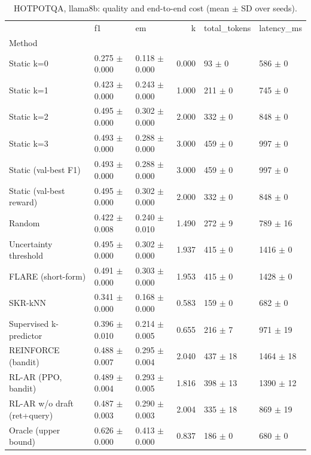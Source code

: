 \begin{table}
\caption{HOTPOTQA, llama8b: quality and end-to-end cost (mean $\pm$ SD over seeds).}
\begin{tabular}{lllrll}
\toprule
 & f1 & em & k & total_tokens & latency_ms \\
Method &  &  &  &  &  \\
\midrule
Static k=0 & 0.275 $\pm$ 0.000 & 0.118 $\pm$ 0.000 & 0.000 & 93 $\pm$ 0 & 586 $\pm$ 0 \\
Static k=1 & 0.423 $\pm$ 0.000 & 0.243 $\pm$ 0.000 & 1.000 & 211 $\pm$ 0 & 745 $\pm$ 0 \\
Static k=2 & 0.495 $\pm$ 0.000 & 0.302 $\pm$ 0.000 & 2.000 & 332 $\pm$ 0 & 848 $\pm$ 0 \\
Static k=3 & 0.493 $\pm$ 0.000 & 0.288 $\pm$ 0.000 & 3.000 & 459 $\pm$ 0 & 997 $\pm$ 0 \\
Static (val-best F1) & 0.493 $\pm$ 0.000 & 0.288 $\pm$ 0.000 & 3.000 & 459 $\pm$ 0 & 997 $\pm$ 0 \\
Static (val-best reward) & 0.495 $\pm$ 0.000 & 0.302 $\pm$ 0.000 & 2.000 & 332 $\pm$ 0 & 848 $\pm$ 0 \\
Random & 0.422 $\pm$ 0.008 & 0.240 $\pm$ 0.010 & 1.490 & 272 $\pm$ 9 & 789 $\pm$ 16 \\
Uncertainty threshold & 0.495 $\pm$ 0.000 & 0.302 $\pm$ 0.000 & 1.937 & 415 $\pm$ 0 & 1416 $\pm$ 0 \\
FLARE (short-form) & 0.491 $\pm$ 0.000 & 0.303 $\pm$ 0.000 & 1.953 & 415 $\pm$ 0 & 1428 $\pm$ 0 \\
SKR-kNN & 0.341 $\pm$ 0.000 & 0.168 $\pm$ 0.000 & 0.583 & 159 $\pm$ 0 & 682 $\pm$ 0 \\
Supervised k-predictor & 0.396 $\pm$ 0.010 & 0.214 $\pm$ 0.005 & 0.655 & 216 $\pm$ 7 & 971 $\pm$ 19 \\
REINFORCE (bandit) & 0.488 $\pm$ 0.007 & 0.295 $\pm$ 0.004 & 2.040 & 437 $\pm$ 18 & 1464 $\pm$ 18 \\
RL-AR (PPO, bandit) & 0.489 $\pm$ 0.004 & 0.293 $\pm$ 0.005 & 1.816 & 398 $\pm$ 13 & 1390 $\pm$ 12 \\
RL-AR w/o draft (ret+query) & 0.487 $\pm$ 0.003 & 0.290 $\pm$ 0.003 & 2.004 & 335 $\pm$ 18 & 869 $\pm$ 19 \\
Oracle (upper bound) & 0.626 $\pm$ 0.000 & 0.413 $\pm$ 0.000 & 0.837 & 186 $\pm$ 0 & 680 $\pm$ 0 \\
\bottomrule
\end{tabular}
\end{table}
